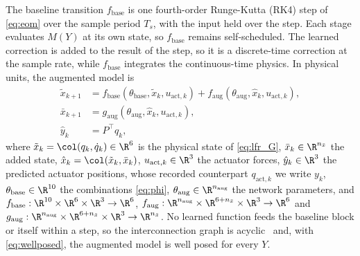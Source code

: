 The baseline transition $f_{\mathrm{base}}$ is one fourth-order Runge-Kutta
(RK4) step of \eqref{eq:eom} over the sample period $T_s$, with the input held
over the step.
Each stage evaluates $M(Y)$ at its own state, so $f_{\mathrm{base}}$ remains
self-scheduled.
The learned correction is added to the result of the step, so it is a
discrete-time correction at the sample rate, while $f_{\mathrm{base}}$
integrates the continuous-time physics.
In physical units, the augmented model is
\begin{equation}
\begin{aligned}
 \tilde x_{k+1}
 &=f_{\mathrm{base}}(\theta_{\mathrm{base}},\tilde x_k,u_{\mathrm{act},k})
   +f_{\mathrm{aug}}(\theta_{\mathrm{aug}},\hat x_k,u_{\mathrm{act},k}),\\
 \bar x_{k+1}
 &=g_{\mathrm{aug}}(\theta_{\mathrm{aug}},\hat x_k,u_{\mathrm{act},k}),\\
 \hat y_k&=P^\top q_k,
\end{aligned}
\label{eq:aug_transition}
\end{equation}
where $\tilde x_k=\col(q_k,\dot q_k)\in\R^6$ is the physical state of
\eqref{eq:lfr_G}, $\bar x_k\in\R^{n_{\bar x}}$ the added state,
$\hat x_k=\col(\tilde x_k,\bar x_k)$, $u_{\mathrm{act},k}\in\R^3$ the actuator
forces, $\hat y_k\in\R^3$ the predicted actuator positions, whose recorded
counterpart $q_{\mathrm{act},k}$ we write $y_k$,
$\theta_{\mathrm{base}}\in\R^{10}$ the combinations \eqref{eq:phi},
$\theta_{\mathrm{aug}}\in\R^{n_{\mathrm{aug}}}$ the network parameters, and
$f_{\mathrm{base}}:\R^{10}\times\R^6\times\R^3\to\R^6$,
$f_{\mathrm{aug}}:\R^{n_{\mathrm{aug}}}\times\R^{6+n_{\bar x}}\times\R^3\to\R^6$
and $g_{\mathrm{aug}}:\R^{n_{\mathrm{aug}}}\times\R^{6+n_{\bar x}}\times\R^3\to\R^{n_{\bar x}}$.
No learned function feeds the baseline block or itself within a step, so the
interconnection graph is acyclic~\cite[Thm.~1]{hoekstra2025lfr} and, with
\eqref{eq:wellposed}, the augmented model is well posed for every $Y$.

